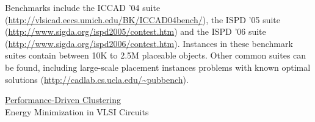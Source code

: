 \documentclass[natbib]{svcyclop}
\begin{document}
\DataSets

Benchmarks include the ICCAD '04 suite
(\url{http://vlsicad.eecs.umich.edu/BK/ICCAD04bench/}), the ISPD '05
suite (\url{http://www.sigda.org/ispd2005/contest.htm}) and the ISPD '06
suite (\url{http://www.sigda.org/ispd2006/contest.htm}). Instances in
these benchmark suites contain between 10K to 2.5M placeable objects.
Other common suites can be found, including large-scale placement
instances problems with known optimal solutions
(\url{http://cadlab.cs.ucla.edu/~pubbench}).

\CrossRef
\href{http://link.springer.com/referenceworkentry/10.1007%2F978-0-387-30162-4_291}
{Performance-Driven Clustering}\\
Energy Minimization in VLSI Circuits

%
%
%
%
%
%
%


%
%
%
%
%
%


\end{document}
